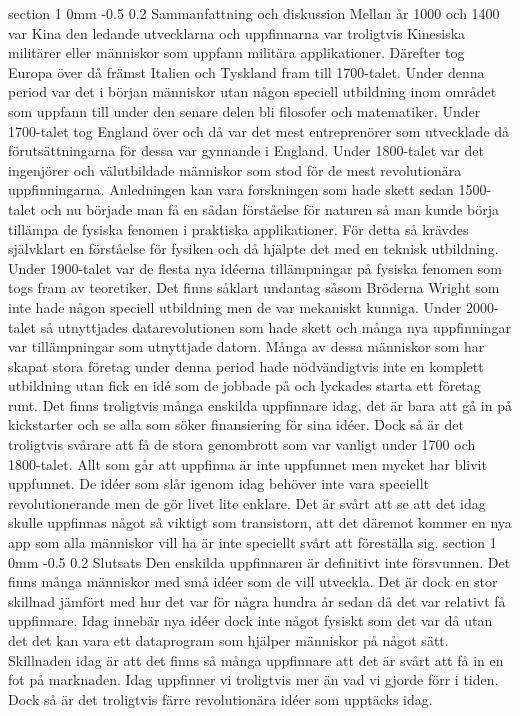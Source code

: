 \documentclass[a4paper,12pt]{article}
\makeatletter
\renewcommand{\section}{\@startsection
   {section}%
   {1}%
   {0mm}%
   {-0.5\baselineskip}%
   {0.2\baselineskip}%
   {\sffamily\bfseries\upshape\normalsize}}%
\makeatother
\begin{document}
\section{Sammanfattning och diskussion}
Mellan år 1000 och 1400 var Kina den ledande utvecklarna och uppfinnarna var troligtvis Kinesiska militärer eller människor som uppfann militära applikationer. Därefter tog Europa över då främst Italien och Tyskland fram till 1700-talet. Under denna period var det i början människor utan någon speciell utbildning inom området som uppfann till under den senare delen bli filosofer och matematiker. Under 1700-talet tog England över och då var det mest entreprenörer som utvecklade då förutsättningarna för dessa var gynnande i England. Under 1800-talet var det ingenjörer och välutbildade människor som stod för de mest revolutionära uppfinningarna. Anledningen kan vara forskningen som hade skett sedan 1500-talet och nu började man få en sådan förståelse för naturen så man kunde börja tillämpa de fysiska fenomen i praktiska applikationer. För detta så krävdes självklart en förståelse för fysiken och då hjälpte det med en teknisk utbildning. 
\newline
\newline
Under 1900-talet var de flesta nya idéerna tillämpningar på fysiska fenomen som togs fram av teoretiker. Det finns såklart undantag såsom Bröderna Wright som inte hade någon speciell utbildning men de var mekaniskt kunniga. Under 2000-talet så utnyttjades datarevolutionen som hade skett och många nya uppfinningar var tillämpningar som utnyttjade datorn. Många av dessa människor som har skapat stora företag under denna period hade nödvändigtvis inte en komplett utbildning utan fick en idé som de jobbade på och lyckades starta ett företag runt. Det finns troligtvis många enskilda uppfinnare idag, det är bara att gå in på kickstarter och se alla som söker finansiering för sina idéer. Dock så är det troligtvis svårare att få de stora genombrott som var vanligt under 1700 och 1800-talet. Allt som går att uppfinna är inte uppfunnet men mycket har blivit uppfunnet. De idéer som slår igenom idag behöver inte vara speciellt revolutionerande men de gör livet lite enklare. Det är svårt att se att det idag skulle uppfinnas något så viktigt som transistorn, att det däremot kommer en nya app som alla människor vill ha är inte speciellt svårt att föreställa sig. 
\section{Slutsats}
Den enskilda uppfinnaren är definitivt inte försvunnen. Det finns många människor med små idéer som de vill utveckla. Det är dock en stor skillnad jämfört med hur det var för några hundra år sedan då det var relativt få uppfinnare. Idag innebär nya idéer dock inte något fysiskt som det var då utan det det kan vara ett dataprogram som hjälper människor på något sätt. Skillnaden idag är att det finns så många uppfinnare att det är svårt att få in en fot på marknaden. 
\newline
\newline
Idag uppfinner vi troligtvis mer än vad vi gjorde förr i tiden. Dock så är det troligtvis färre revolutionära idéer som upptäcks idag. 
\end{document}
